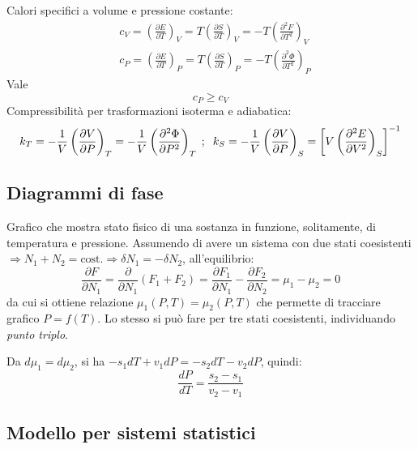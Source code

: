 \documentclass[10pt, a4paper]{scrartcl}
\numberwithin{equation}{subsection}
\theoremstyle{style1}
\begin{document}
Calori specifici a volume e pressione costante:
\begin{equation}
	\begin{split}
		&c_V = \left(\frac{\partial E}{\partial T} \right) _V = T \left(\frac{\partial S}{\partial T} \right) _V = -T \left(\frac{\partial ^2 F}{\partial T^2} \right) _V \\
		&c_P = \left(\frac{\partial E}{\partial T} \right) _P = T \left(\frac{\partial S}{\partial T} \right) _P = -T \left(\frac{\partial ^2 \Phi}{\partial T^2} \right) _P
	\end{split}
\end{equation}
Vale
\begin{equation}
	c_P \ge  c_V
\end{equation}
Compressibilit\`a per trasformazioni isoterma e adiabatica:
\begin{equation}
	k_T = -\frac{1}{V} \left(\frac{\partial V}{\partial P} \right) _T=-\frac{1}{V}\left(\frac{\partial ^2\Phi}{\partial P^2} \right) _T \hspace{.1cm} ; \hspace{.2cm} k_S = -\frac{1}{V } \left(\frac{\partial V}{\partial P} \right) _S = \left[ V \left(\frac{\partial ^2E}{\partial V^2} \right) _S \right] ^{-1} 
\end{equation}
\subsection{Diagrammi di fase}
Grafico che mostra stato fisico di una sostanza in funzione, solitamente, di temperatura e pressione. Assumendo di avere un sistema con due stati coesistenti $\Rightarrow N_1+N_2 = \text{cost.}\Rightarrow \delta N_1 = - \delta N_2$, all'equilibrio:
\[
\frac{\partial F}{\partial N_1} = \frac{\partial }{\partial N_1} (F_1+F_2) = \frac{\partial F_1}{\partial N_1} -\frac{\partial F_2}{\partial N_2} = \mu_1-\mu_2 = 0
\] 
da cui si ottiene relazione $\mu _1 (P,T) = \mu _2(P,T)$ che permette di tracciare grafico $P=f(T)$. Lo stesso si pu\`o fare per tre stati coesistenti, individuando \textit{punto triplo}. 

Da $d\mu_1 = d \mu _2$, si ha $-s_1 dT + v_1 dP = -s_2 dT - v_2dP$, quindi:
\begin{equation}
	\frac{d P}{d T} = \frac{s_2-s_1}{v_2-v_1}
\end{equation}
\subsection{Modello per sistemi statistici}
\end{document}
